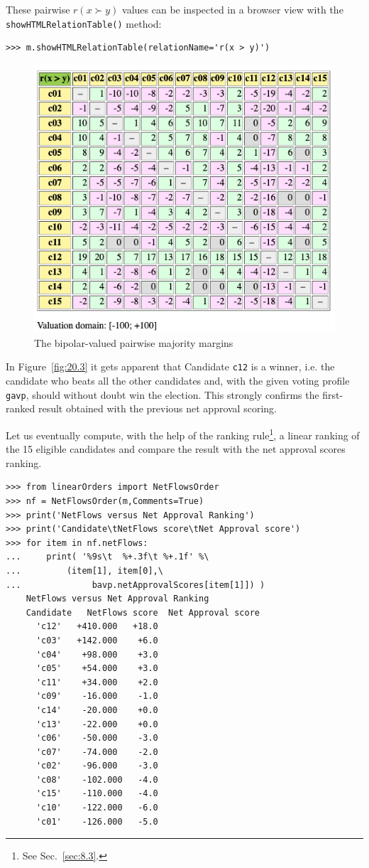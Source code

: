 These pairwise $r(x \succ y)$ values can be inspected in a browser view with the \texttt{showHTMLRelationTable()} method: 
\begin{lstlisting}
>>> m.showHTMLRelationTable(relationName='r(x > y)')
\end{lstlisting}
\begin{figure}[ht]
\includegraphics[width=0.8\hsize]{Figures/20-3-majMargAV.png}
\caption{The bipolar-valued pairwise majority margins} 
\label{fig:20.3}       %
\end{figure}

In Figure~\vref{fig:20.3} it gets apparent that Candidate \texttt{c12} is a \Condorcet winner, i.e. the candidate who beats all the other candidates and, with the given voting profile \texttt{gavp}, should without doubt win the election. This strongly confirms the first-ranked result obtained with the previous net approval scoring. 

Let us eventually compute, with the help of the \NetFlows ranking rule\footnote{See Sec.~\ref{sec:8.3}.}, a linear ranking of the 15 eligible candidates and compare the result with the net approval scores ranking.
\begin{lstlisting}[caption={Comparing the net approval and the \NetFlows rankings},label=list:20.11]
>>> from linearOrders import NetFlowsOrder
>>> nf = NetFlowsOrder(m,Comments=True)
>>> print('NetFlows versus Net Approval Ranking')
>>> print('Candidate\tNetFlows score\tNet Approval score')
>>> for item in nf.netFlows:
...     print( '%9s\t  %+.3f\t %+.1f' %\
...	        (item[1], item[0],\
...              bavp.netApprovalScores[item[1]]) ) 
    NetFlows versus Net Approval Ranking
    Candidate	NetFlows score	Net Approval score
      'c12'	  +410.000	 +18.0
      'c03'	  +142.000	  +6.0
      'c04'	   +98.000	  +3.0
      'c05'	   +54.000	  +3.0
      'c11'	   +34.000	  +2.0
      'c09'	   -16.000	  -1.0
      'c14'	   -20.000	  +0.0
      'c13'	   -22.000	  +0.0
      'c06'	   -50.000	  -3.0
      'c07'	   -74.000	  -2.0
      'c02'	   -96.000	  -3.0
      'c08'	   -102.000	  -4.0
      'c15'	   -110.000	  -4.0
      'c10'	   -122.000	  -6.0
      'c01'	   -126.000	  -5.0
\end{lstlisting}


